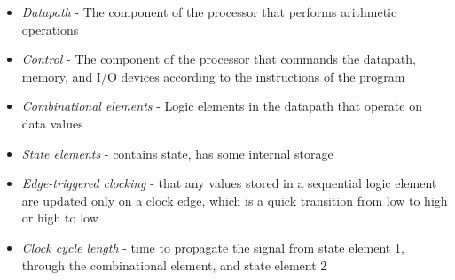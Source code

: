 \documentclass[a4paper, 11pt,oneside]{article}
\begin{document}
\begin{itemize}
	\item{\textit{Datapath} - The component of the processor that performs arithmetic operations}

	\item{\textit{Control} - The component of the processor that commands the datapath, memory, and I/O devices according to the instructions of the program}

	\item{\textit{Combinational elements} - Logic elements in the datapath that operate on data values}

	\item{\textit{State elements} - contains state, has some internal storage}

	\item{\textit{Edge-triggered clocking} - that any values stored in a sequential logic element are updated only on a clock edge, which is a quick transition from low to high or high to low}

	\item{\textit{Clock cycle length} - time to propagate the signal from state element 1, through the combinational element, and state element 2}

\end{itemize}
\end{document}
